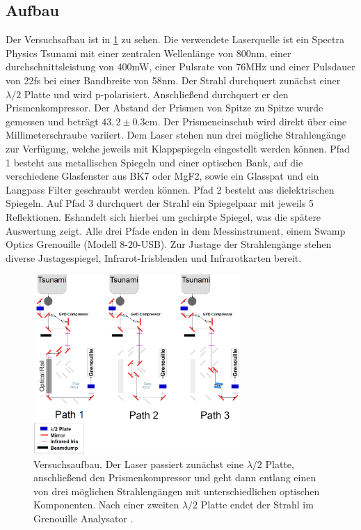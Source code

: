 \documentclass[twoside,        %
               BCOR12mm,       %
               english,ngerman, %
               fleqn,headsepline=false,footsepline=false
              ]{Vorlage/MFPREPORT}
\begin{document}
\subsection{Aufbau}
Der Versuchsafbau ist in \cref{fig:aufbau} zu sehen. Die verwendete Laserquelle
ist ein Spectra Physics Tsunami mit einer zentralen Wellenlänge von 800\;nm,
einer durchschnittsleistung von 400\;mW, einer Pulsrate von 76\;MHz und einer
Pulsdauer von 22\;fs bei einer Bandbreite von 58\;nm. Der Strahl durchquert
zunächst einer $\lambda/2$ Platte und wird p-polarisiert. Anschließend
durchquert er den Prismenkompressor. Der Abstand der Prismen von Spitze zu
Spitze wurde gemessen und beträgt $43,2\pm0.3$\;cm. Der Prismeneinschub wird
direkt über eine Millimeterschraube variiert. Dem Laser stehen nun
drei mögliche Strahlengänge zur Verfügung, welche jeweils mit Klappspiegeln
eingestellt werden können. Pfad 1 besteht aus metallischen Spiegeln und einer
optischen Bank, auf die verschiedene Glasfenster aus BK7 oder MgF2, sowie ein
Glasspat und ein Langpass Filter geschraubt werden können. Pfad 2 besteht aus
dielektrischen Spiegeln. Auf Pfad 3 durchquert der Strahl ein Spiegelpaar mit
jeweils 5 Reflektionen. Eshandelt sich hierbei um gechirpte Spiegel, was die
spätere Auswertung zeigt. Alle drei Pfade enden in dem Messinstrument, einem
Swamp Optics Grenouille (Modell 8-20-USB). Zur Justage der Strahlengänge stehen
diverse Justagespiegel, Infrarot-Irisblenden und Infrarotkarten bereit.

\begin{figure}[]
    \begin{center}
        \includegraphics[width=0.7\textwidth]{aufbau1.eps}
    \end{center}
    \caption{Versuchsaufbau. Der Laser passiert zunächst eine $\lambda/2$
    Platte, anschließend den Prismenkompressor und geht dann entlang einen von
    drei möglichen Strahlengängen mit unterschiedlichen optischen Komponenten.
    Nach einer zweiten $\lambda/2$ Platte endet der Strahl im Grenouille
    Analysator \cite{fprakt}.}
    \label{fig:aufbau}
\end{figure}
\end{document}

